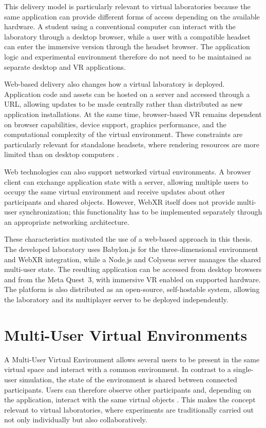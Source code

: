 This delivery model is particularly relevant to virtual laboratories because the same application can provide different forms of access depending on the available hardware. A student using a conventional computer can interact with the laboratory through a desktop browser, while a user with a compatible headset can enter the immersive version through the headset browser. The application logic and experimental environment therefore do not need to be maintained as separate desktop and VR applications.

Web-based delivery also changes how a virtual laboratory is deployed. Application code and assets can be hosted on a server and accessed through a URL, allowing updates to be made centrally rather than distributed as new application installations. At the same time, browser-based VR remains dependent on browser capabilities, device support, graphics performance, and the computational complexity of the virtual environment. These constraints are particularly relevant for standalone headsets, where rendering resources are more limited than on desktop computers \cite{monteiro2024immersive}.

Web technologies can also support networked virtual environments. A browser client can exchange application state with a server, allowing multiple users to occupy the same virtual environment and receive updates about other participants and shared objects. However, WebXR itself does not provide multi-user synchronization; this functionality has to be implemented separately through an appropriate networking architecture.

These characteristics motivated the use of a web-based approach in this thesis. The developed laboratory uses Babylon.js for the three-dimensional environment and WebXR integration, while a Node.js and Colyseus server manages the shared multi-user state. The resulting application can be accessed from desktop browsers and from the Meta Quest~3, with immersive VR enabled on supported hardware. The platform is also distributed as an open-source, self-hostable system, allowing the laboratory and its multiplayer server to be deployed independently.


\section{Multi-User Virtual Environments}

A Multi-User Virtual Environment  allows several users to be present in the same virtual space and interact with a common environment. In contrast to a single-user simulation, the state of the environment is shared between connected participants. Users can therefore observe other participants and, depending on the application, interact with the same virtual objects \cite{dalgarno2010learning}. This makes the concept relevant to virtual laboratories, where experiments are traditionally carried out not only individually but also collaboratively.

